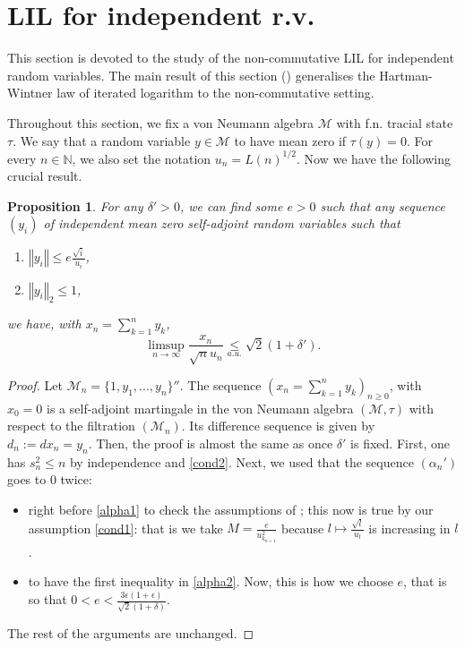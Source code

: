 \documentclass[10pt]{amsart}
\newtheorem{prop}[thm]{Proposition}
\theoremstyle{definition}
\theoremstyle{myremark}
\numberwithin{equation}{section}
\def\N{\mathbb N}
\newcommand{\CM}{\mathcal{M}}
\newcommand{\norm}[1]{\left\Vert#1\right\Vert}
\begin{document}
  
  
    \section{LIL for independent r.v.}\label{sec: lil for indep rv}

 This section is devoted to the study of the non-commutative LIL for independent random variables. The main result of this section () generalises the Hartman-Wintner law of iterated logarithm \cite{hartman1941law} to the non-commutative setting. 
 
 Throughout this section, we fix a von Neumann algebra $\CM$ with f.n. tracial state $\tau$. We say that a random variable $y \in \CM$ to have mean zero if $\tau(y)=0$. For every $n \in \N$, we also set the notation $u_n=L(n)^{1/2}$. Now we have the following crucial result.


  
\begin{prop}\label{prop : variation}
    For any $\delta'>0$, we can find some $e>0$ such that any sequence $(y_i)$ of  independent mean zero self-adjoint random variables such that 
    \begin{enumerate}
        \item\label{cond1} $\norm{y_i} \leq e \frac{\sqrt{i}}{u_i}$, 
        \item \label{cond2}$\norm{y_i}_2 \leq 1$,
    \end{enumerate}
    we have, with  $x_n=\sum_{k=1}^n y_k$, 
    $$ 
    \limsup_{n \to \infty} \frac{x_n}{\sqrt{n} u_n}  \underset{a.u.}{\leq }\sqrt{2}(1+\delta'). $$
  \end{prop}

  \begin{proof}
   Let $\CM_n=\{1, y_1,...,y_n\}''$. The sequence $(x_n=\sum_{k=1}^n y_k)_{n \ge 0}$, with $x_0 = 0$
  is a self-adjoint martingale in the von Neumann algebra $(\mathcal{M}, \tau)$
  with respect to the filtration $(\CM_n)$. Its difference sequence is given by $d_n:=dx_n=y_n$.  Then, the proof is almost the same as  once $\delta'$ is fixed. First, one has $s_n^2\leq n$ by independence and  \eqref{cond2}. Next, we used that the sequence $(\alpha_n')$ goes to 0 twice: 
    \begin{itemize}
    \item right before \eqref{alpha1} to check the assumptions of
      ; this now is true by our assumption \eqref{cond1}:
      that is we take $M=\frac e{u^2_{k_{n+1}}}$ because
      $l\mapsto \frac {\sqrt l}{u_l}$ is increasing in $l$. 
      \item to have the first inequality in \eqref{alpha2}. Now, this is how we choose $e$, that is so that $0<e<\frac{3\epsilon (1+\epsilon) }{\sqrt2(1+\delta)}$.
      \end{itemize}
  The rest of the arguments are unchanged.     
 \end{proof}
 
\end{document}
